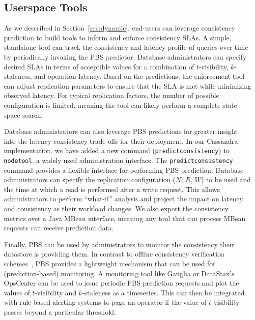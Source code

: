 \subsection{Userspace Tools}

As we described in Section~\ref{sec:dynamic}, end-users can leverage
consistency prediction to build tools to inform and enforce
consistency SLAs. A simple, standalone tool can track the consistency
and latency profile of queries over time by periodically invoking the
PBS predictor. Database administrators can specify desired SLAs in
terms of acceptible values for a combination of $t$-visibility,
$k$-staleness, and operation latency. Based on the predictions, the
enforcement tool can adjust replication parameters to ensure that the
SLA is met while minimizing observed latency. For typical replication
factors, the number of possible configuration is limited, meaning the
tool can likely perform a complete state space search.

Database administrators can also leverage PBS predictions for greater
insight into the latency-consistency trade-offs for their
deployment. In our Cassandra implementation, we have added a new
command (\texttt{predictconsistency}) to \texttt{nodetool}, a widely
used administration interface.  The \texttt{predictconsistency}
command provides a flexible interface for performing PBS
prediction. Database administrators can specify the replication
configuration ($N$, $R$, $W$) to be used and the time at which a read
is performed after a write request. This allows administrators to
perform ``what-if'' analysis and project the impact on latency and
consistency as their workload changes.  We also export the consistency
metrics over a Java MBean interface, meaning any tool that can process
MBean requests can receive prediction data.


Finally, PBS can be used by administrators to monitor the consistency
their datastore is providing them. In contrast to offline consistency
verification schemes~\cite{podc-hpl}, PBS provides a lightweight
mechanism that can be used for (prediction-based) monitoring. A
monitoring tool like Ganglia or DataStax's OpsCenter can be used to
issue periodic PBS prediction requests and plot the values of
$t$-visibility and $k$-staleness as a timeseries. This can then be
integrated with rule-based alerting systems to page an operator if the
value of $t$-visibility passes beyond a particular threshold.
